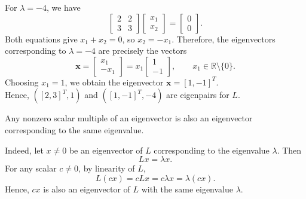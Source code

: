 \begin{example}
	For \( \lambda = -4 \), we have
	\begin{equation}
		\begin{bmatrix} 2 & 2\\ 3 & 3 \end{bmatrix}
		\begin{bmatrix} x_1\\ x_2 \end{bmatrix}
		= \begin{bmatrix} 0\\ 0 \end{bmatrix}.
		\label{eq:eigenvalue-example-5}
	\end{equation}
	Both equations give \( x_1 + x_2 = 0 \), so \( x_2 = -x_1 \). Therefore, the eigenvectors corresponding to \( \lambda = -4 \) are precisely the vectors
	\begin{equation}
		\mathbf{x}
		= \begin{bmatrix} x_1\\ -x_1 \end{bmatrix}
		= x_1 \begin{bmatrix} 1\\ -1 \end{bmatrix},
		\qquad x_1 \in \mathbb{R} \setminus \{0\}.
		\label{eq:eigenvalue-example-6}
	\end{equation}
	Choosing \( x_1 = 1 \), we obtain the eigenvector \( \mathbf{x} = [1,-1]^T \). \\
	Hence, \( ([2,3]^T,1) \) and \( ([1,-1]^T,-4) \) are eigenpairs for \( L \).
\end{example}

\begin{remark}
	Any nonzero scalar multiple of an eigenvector is also an eigenvector corresponding to the same eigenvalue.

	Indeed, let \( x \neq 0 \) be an eigenvector of \( L \) corresponding to the eigenvalue \( \lambda \). Then
	\begin{equation}
		Lx = \lambda x.
	\end{equation}
	For any scalar \( c \neq 0 \), by linearity of \( L \),
	\begin{equation}
		L(cx) = cLx = c\lambda x = \lambda(cx).
	\end{equation}
	Hence, \( cx \) is also an eigenvector of \( L \) with the same eigenvalue \( \lambda \).
\end{remark}
